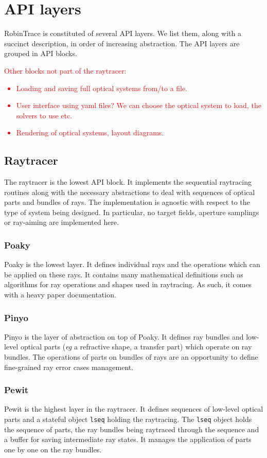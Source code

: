 \section{API layers}
RobinTrace is constituted of several API layers. We list them, along with a
succinct description, in order of increasing abstraction. The API layers are
grouped in API blocks.

\textcolor{red}{Other blocks not part of the raytracer:
\begin{itemize}
\item Loading and saving full optical systems from/to a file.
\item User interface using yaml files? We can choose the optical system to load,
the solvers to use etc.
\item Rendering of optical systems, layout diagrams.
\end{itemize}}

\subsection{Raytracer}
The raytracer is the lowest API block. It implements the sequential raytracing
routines along with the necessary abstractions to deal with sequences of optical
parts and bundles of rays. The implementation is agnostic with respect to the
type of system being designed. In particular, no target fields, aperture
samplings or ray-aiming are implemented here.

\subsubsection{Poaky}
Poaky is the lowest layer. It defines individual rays and the operations which
can be applied on these rays. It contains many mathematical definitions
such as algorithms for ray operations and shapes used in raytracing. As such,
it comes with a heavy paper documentation.

\subsubsection{Pinyo}
Pinyo is the layer of abstraction on top of Poaky. It defines ray bundles and
low-level optical parts (\textit{eg} a refractive shape, a transfer part) which
operate on ray bundles. The operations of parts on bundles of rays are an
opportunity to define fine-grained ray error cases management.

\subsubsection{Pewit}
Pewit is the highest layer in the raytracer. It defines sequences of low-level
optical parts and a stateful object \lstinline{lseq} holding the raytracing. The
\lstinline{lseq} object holds the sequence of parts, the ray bundles being
raytraced through the sequence and a buffer for saving intermediate ray states.
It manages the application of parts one by one on the ray bundles.

